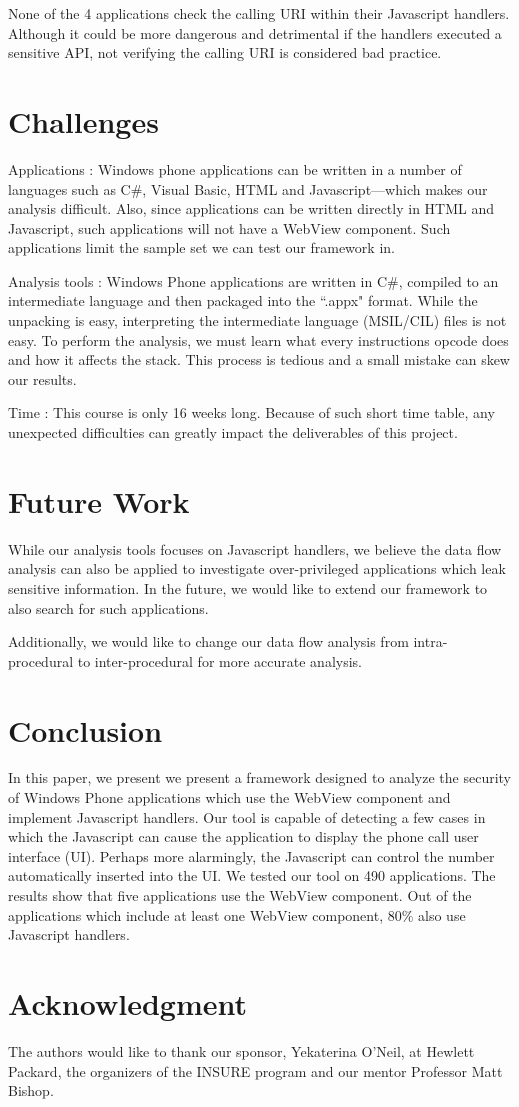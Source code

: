 \documentclass[conference]{IEEEtran}
\begin{document}
None of the 4 applications check the calling URI within their Javascript handlers.
Although it could be more dangerous and detrimental if the handlers executed a sensitive API, not verifying the calling URI is considered bad practice.

\section{Challenges}

Applications :  Windows phone applications can be written in a number of languages such as C\#, Visual Basic, HTML and Javascript---which makes our analysis difficult. Also, since applications can be written directly in HTML and Javascript, such applications will not have a WebView component. Such applications limit the sample set we can test our framework in.

Analysis tools : Windows Phone applications are written in C\#, compiled to an intermediate language and then packaged into the ``.appx" format. While the unpacking is easy, interpreting the intermediate language (MSIL/CIL) files is not easy. To perform the analysis, we must learn what every instructions opcode does and how it affects the stack. This process is tedious and a small mistake can skew our results.

Time : This course is only 16 weeks long. Because of such short time table, any unexpected difficulties can greatly impact the deliverables of this project.

\section{Future Work}

While our analysis tools focuses on Javascript handlers, we believe the data flow analysis can also be applied to investigate over-privileged applications which leak sensitive information.
In the future, we would like to extend our framework to also search for such applications.

Additionally, we would like to change our data flow analysis from intra-procedural to inter-procedural for more accurate analysis.

\section{Conclusion}
In this paper, we present we present a framework designed to analyze the security of Windows Phone applications which use the WebView component and implement Javascript handlers. Our tool is capable of detecting a few cases in which the Javascript can cause the application to display the phone call user interface (UI). Perhaps more alarmingly, the Javascript can control the number automatically inserted into the UI. We tested our tool on 490 applications. The results show that five applications use the WebView component. Out of the applications which include at least one WebView component, 80\% also use Javascript handlers.

\section*{Acknowledgment}
The authors would like to thank our sponsor, Yekaterina O'Neil, at Hewlett Packard, the organizers of the INSURE program and our mentor Professor Matt Bishop.



\end{document}
